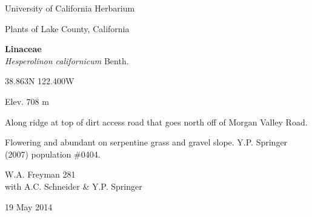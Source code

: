 \documentclass[letterpaper,10pt]{article}
\begin{document}
\begin{minipage}[t]{0.40\textwidth}

\begin{center}
University of California Herbarium \\
\begin{large}
Plants of Lake County, California \\
\end{large}
\vspace{\baselineskip}
\textbf{Linaceae} \\
\textit{Hesperolinon californicum} Benth.\\
\end{center}

\begin{footnotesize}

\begin{multicols}{2}
38.863\textdegree N 122.400\textdegree W
\columnbreak
\begin{flushright}
Elev. 708 m
\end{flushright}
\end{multicols}

Along ridge at top of dirt access road that goes north off of Morgan Valley Road.
\vspace{\baselineskip}

Flowering and abundant on serpentine grass and gravel slope. Y.P. Springer (2007) population \#0404.

\begin{multicols}{2}
W.A. Freyman 281 \\
with A.C. Schneider \& Y.P. Springer
\columnbreak
\begin{flushright}
19 May 2014
\end{flushright}
\end{multicols}

\end{footnotesize}

\end{minipage}
%
\hspace{2cm}
%
\end{document}
